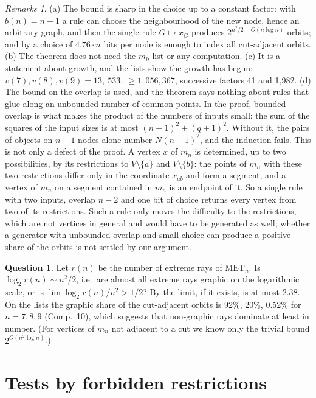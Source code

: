 \documentclass[11pt,a4paper]{article}
\theoremstyle{definition}
\newtheorem{question}{Question}
\theoremstyle{remark}
\newtheorem*{remarks}{Remarks}
\newcommand{\MET}{\mathrm{MET}}
\begin{document}
\begin{remarks}
(a) The bound is sharp in the choice up to a constant factor: with $b(n) = n - 1$ a rule can choose the
neighbourhood of the new node, hence an arbitrary graph, and then the single rule $G \mapsto x_G$ produces
$2^{n^2/2 - O(n \log n)}$ orbits; and by \cite{CL25} a choice of $4.76\cdot n$ bits per node is enough to index all
cut-adjacent orbits.
(b) The theorem does not need the $m_9$ list or any computation.
(c) It is a statement about growth, and the lists show the growth has begun:
$v(7), v(8), v(9) = 13,\ 533,\ \ge 1{,}056{,}367$, successive factors 41 and 1,982.
(d) The bound on the overlap is used, and the theorem says nothing about rules that glue along an unbounded number
of common points. In the proof, bounded overlap is what makes the product of the numbers of inputs small: the sum
of the squares of the input sizes is at most $(n - 1)^2 + (q + 1)^2$. Without it, the pairs of objects on $n - 1$
nodes alone number $N(n - 1)^2$, and the induction fails. This is not only a defect of the proof. A vertex $x$ of
$m_n$ is determined, up to two possibilities, by its restrictions to $V \setminus \{a\}$ and $V \setminus \{b\}$:
the points of $m_n$ with these two restrictions differ only in the coordinate $x_{ab}$ and form a segment, and a
vertex of $m_n$ on a segment contained in $m_n$ is an endpoint of it. So a single rule with two inputs, overlap
$n - 2$ and one bit of choice returns every vertex from two of its restrictions. Such a rule only moves the
difficulty to the restrictions, which are not vertices in general and would have to be generated as well; whether
a generator with unbounded overlap and small choice can produce a positive share of the orbits is not settled by
our argument.
\end{remarks}

\begin{question}\label{q:one}
Let $r(n)$ be the number of extreme rays of $\MET_n$. Is $\log_2 r(n) \sim n^2/2$, i.e.\ are almost all extreme rays
graphic on the logarithmic scale, or is $\lim \log_2 r(n)/n^2 > 1/2$? By \cite{CL25} the limit, if it exists, is at
most $2.38$. On the lists the graphic share of the cut-adjacent orbits is 92\%, 20\%, 0.52\% for $n = 7, 8, 9$
(Comp.~10), which suggests that non-graphic rays dominate at least in number. (For vertices of $m_n$ not adjacent to a
cut we know only the trivial bound $2^{O(n^2 \log n)}$.)
\end{question}

\section{Tests by forbidden restrictions}\label{sec:hereditary}
\end{document}
